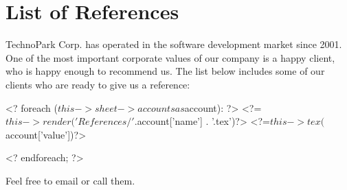 
\section*{List of References}

TechnoPark Corp. has operated in the software development market since 2001. One of
the most important corporate values of our company is a happy client, who is happy enough to recommend us. 
The list below includes some of our clients who are ready to give us a
reference:

<? foreach ($this->sheet->accounts as $account): ?>
    <?=$this->render('References/' . $account['name'] . '.tex')?>{}
    <?=$this->tex($account['value'])?>{}
    
<? endforeach; ?>

Feel free to email or call them.
